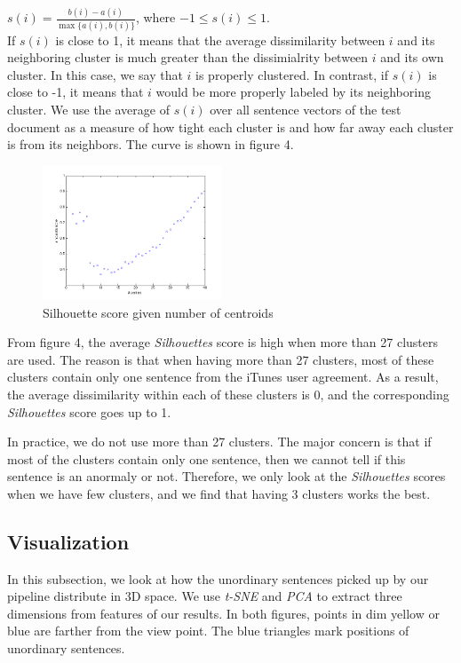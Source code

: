 \documentclass[conference,compsoc]{IEEEtran}
\begin{document}
  $s(i) = \frac{b(i) - a(i)}{\max\{a(i), b(i)\}} $, where $-1 \leq s(i) \leq 1$. \\

  If $s(i)$ is close to 1, it means that the average dissimilarity between $i$ and its neighboring cluster is much greater than the dissimialrity between $i$ and its own cluster. In this case, we say that $i$ is properly clustered. In contrast, if $s(i)$ is close to -1, it means that $i$ would be more properly labeled by its neighboring cluster. We use the average of $s(i)$ over all sentence vectors of the test document as a measure of how tight each cluster is and how far away each cluster is from its neighbors. The curve is shown in figure 4. 

  \begin{figure}[h!]
  \centering
          \includegraphics[height=4cm]{sildis.png}
      \caption{Silhouette score given number of centroids}
      \label{fig:verticalcell}
  \end{figure}  

  From figure 4, the average \emph{Silhouettes} score is high when more than 27 clusters are used. The reason is that when having more than 27 clusters, most of these clusters contain only one sentence from the iTunes user agreement. As a result, the average dissimilarity within each of these clusters is 0, and the corresponding \emph{Silhouettes} score goes up to 1. 

  In practice, we do not use more than 27 clusters. The major concern is that if most of the clusters contain only one sentence, then we cannot tell if this sentence is an anormaly or not. Therefore, we only look at the \emph{Silhouettes} scores when we have few clusters, and we find that having 3 clusters works the best. 

  \subsection{Visualization}
  In this subsection, we look at how the unordinary sentences picked up by our pipeline distribute in 3D space. We use \emph{t-SNE} \cite{tsne} and \emph{PCA} to extract three dimensions from features of our results. In both figures, points in dim yellow or blue are farther from the view point. The blue triangles mark positions of unordinary sentences. 
\end{document}
